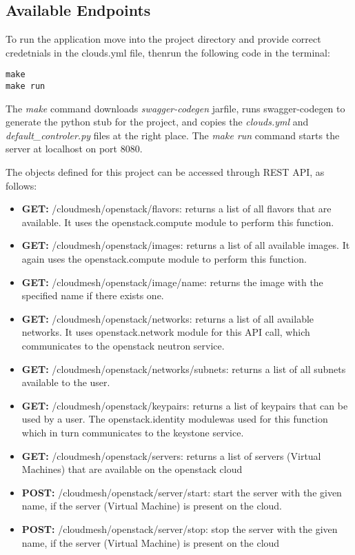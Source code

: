 \subsection{Available Endpoints}
To run the application move into the project directory and provide
correct credetnials in the clouds.yml file, thenrun the
following code in the terminal:
\begin{verbatim}
make
make run
\end{verbatim}
The \emph{make} command downloads \emph{swagger-codegen} jarfile, runs
swagger-codegen to generate the python stub for the project, and
copies the \emph{clouds.yml} and \emph{default\_controler.py} files at
the right place. The \emph{make run} command starts the server at
localhost on port 8080.

The objects defined for this project can be accessed through REST API, as
follows:
\begin{itemize}
\item \textbf{GET:} /cloudmesh/openstack/flavors: returns a list of all
flavors
that are available. It uses the openstack.compute module to perform this
function.

\item \textbf{GET:} /cloudmesh/openstack/images: returns a list of all
available images. It again uses the openstack.compute module to perform this
function.
\item \textbf{GET:} /cloudmesh/openstack/image/{name}: returns the image
with the specified name if there exists one.
\item \textbf{GET:} /cloudmesh/openstack/networks: returns a list of all
available networks. It uses openstack.network module for this API call, which
communicates to the openstack neutron service.
\item \textbf{GET:} /cloudmesh/openstack/networks/subnets: returns a list of
all subnets available to the user.
\item \textbf{GET:} /cloudmesh/openstack/keypairs: returns a list of keypairs
that can be used by a user. The openstack.identity modulewas used for this
function which in turn communicates to the keystone service.
\item \textbf{GET:} /cloudmesh/openstack/servers: returns a list of servers
(Virtual Machines) that are available on the openstack cloud
\item \textbf{POST:} /cloudmesh/openstack/server/start: start the server with
the given name, if the server (Virtual Machine) is present on the cloud.
\item \textbf{POST:} /cloudmesh/openstack/server/stop: stop the server with
the given name, if the server (Virtual Machine) is present on the cloud

\end{itemize}

